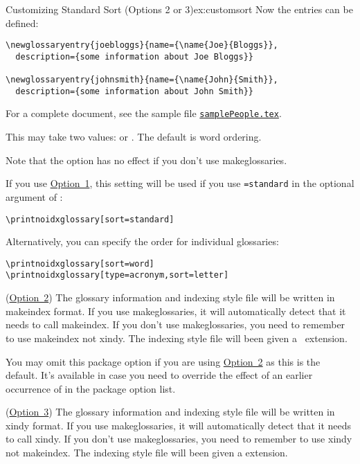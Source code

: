 \documentclass[report,inlinetitle]{nlctdoc}
\newcommand*{\opt}[1]{\hyperlink{option#1}{Option~#1}}
\newcommand*{\gloskey}[2][newglossaryentry]{\csopt{#1}{#2}}
\newcounter{sample}
\newcommand*{\samplefile}[2][sample]{%
  \hyperref[ex:#1#2]{\texttt{#1#2.tex}}}
\begin{document}
\begin{description}
\begin{example}{Customizing Standard Sort (Options 2 or 3)}{ex:customsort}
Now the entries can be defined:
\begin{verbatim}
\newglossaryentry{joebloggs}{name={\name{Joe}{Bloggs}},
  description={some information about Joe Bloggs}}

\newglossaryentry{johnsmith}{name={\name{John}{Smith}},
  description={some information about John Smith}}
\end{verbatim}
For a complete document, see the sample file \samplefile{People}.
\end{example}

\item[\pkgopt{order}] This may take two values: 
 or . The default
is word ordering.

\begin{important}
Note that the  option has no effect if you don't use 
\gls{makeglossaries}.
\end{important}

If you use \opt1, this setting will be used if you use 
\gloskey[printnoidxglossary]{sort}\texttt{=standard} in 
the optional argument of :
\begin{verbatim}
\printnoidxglossary[sort=standard]
\end{verbatim}
Alternatively, you can specify the order for individual glossaries:
\begin{verbatim}
\printnoidxglossary[sort=word]
\printnoidxglossary[type=acronym,sort=letter]
\end{verbatim}

\item[\pkgopt{makeindex}] (\opt2) The glossary information and
indexing style file will be written in \gls{makeindex} format. If
you use \gls{makeglossaries}, it will automatically detect that it
needs to call \gls*{makeindex}. If you don't use
\gls*{makeglossaries}, you need to remember to use \gls*{makeindex}
not \gls{xindy}. The indexing style file will been given 
a~ extension.

You may omit this package option if you are using \opt2 as this is the
default. It's available in case you need to override the effect of an earlier
occurrence of  in the package option list.

\item[\pkgopt{xindy}] (\opt3) The glossary information and indexing style
file will be written in \gls{xindy} format. If you use
\gls{makeglossaries}, it will automatically detect that it needs to
call \gls*{xindy}. If you don't use \gls*{makeglossaries}, you need to
remember to use \gls*{xindy} not \gls{makeindex}. The indexing style
file will been given a  extension.


\end{description}
\end{document}
